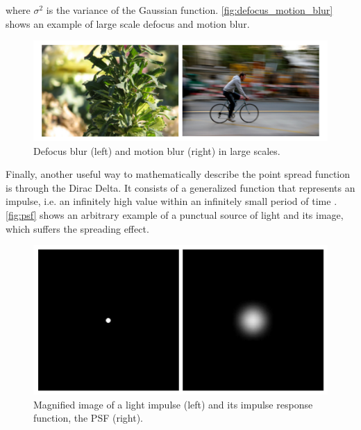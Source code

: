 \noindent where $\sigma^{2}$ is the variance of the Gaussian function. \autoref{fig:defocus_motion_blur} shows an example of large scale defocus and motion blur.

\begin{figure}[H]
	\centering
	\caption{\label{fig:defocus_motion_blur}Defocus blur (left) and motion blur (right) in large scales.}
	\begin{center}
	    \includegraphics[scale=0.4]{images/fig7.png}
	\end{center}
	\centering
\end{figure}

Finally, another useful way to mathematically describe the point spread function is through the Dirac Delta. It consists of a generalized function that represents an impulse, i.e. an infinitely high value within an infinitely small period of time \cite{bracewell2000fourier}. \autoref{fig:psf} shows an arbitrary example of a punctual source of light and its image, which suffers the spreading effect.

\begin{figure}[H]
	\centering
	\caption{\label{fig:psf} Magnified image of a light impulse (left) and its impulse response function, the PSF (right).}
	\begin{center}
	    \includegraphics[scale=0.4]{images/fig8.png}
	\end{center}
	\centering
\end{figure}

